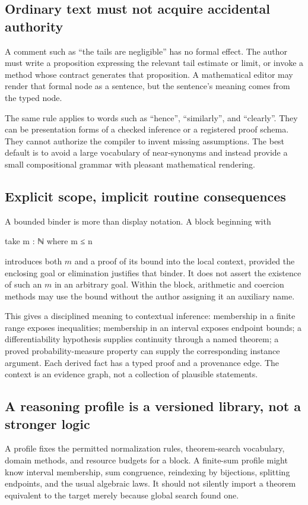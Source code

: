 \documentclass[11pt,letterpaper]{article}
\theoremstyle{definition}
\theoremstyle{remark}
\begin{document}
\subsection{Ordinary text must not acquire accidental authority}
A comment such as ``the tails are negligible'' has no formal effect. The author must write a proposition expressing the relevant tail estimate or limit, or invoke a method whose contract generates that proposition. A mathematical editor may render that formal node as a sentence, but the sentence's meaning comes from the typed node.

The same rule applies to words such as ``hence'', ``similarly'', and ``clearly''. They can be presentation forms of a checked inference or a registered proof schema. They cannot authorize the compiler to invent missing assumptions. The best default is to avoid a large vocabulary of near-synonyms and instead provide a small compositional grammar with pleasant mathematical rendering.

\subsection{Explicit scope, implicit routine consequences}
A bounded binder is more than display notation. A block beginning with
\par\noindent\begin{minipage}{\linewidth}
\begin{Code}
  take m : ℕ where m ≤ n
\end{Code}
\end{minipage}\par\smallskip
introduces both $m$ and a proof of its bound into the local context, provided the enclosing goal or elimination justifies that binder. It does not assert the existence of such an $m$ in an arbitrary goal. Within the block, arithmetic and coercion methods may use the bound without the author assigning it an auxiliary name.

This gives a disciplined meaning to contextual inference: membership in a finite range exposes inequalities; membership in an interval exposes endpoint bounds; a differentiability hypothesis supplies continuity through a named theorem; a proved probability-measure property can supply the corresponding instance argument. Each derived fact has a typed proof and a provenance edge. The context is an evidence graph, not a collection of plausible statements.

\subsection{A reasoning profile is a versioned library, not a stronger logic}
A profile fixes the permitted normalization rules, theorem-search vocabulary, domain methods, and resource budgets for a block. A finite-sum profile might know interval membership, sum congruence, reindexing by bijections, splitting endpoints, and the usual algebraic laws. It should not silently import a theorem equivalent to the target merely because global search found one.
\end{document}
